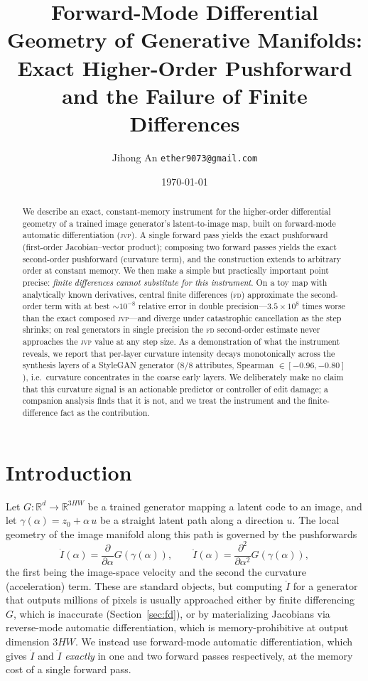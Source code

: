 \documentclass[11pt]{article}
\title{\vspace{-2em}Forward-Mode Differential Geometry of Generative Manifolds:\\
Exact Higher-Order Pushforward and the Failure of Finite Differences}
\author{Jihong An \quad\texttt{ether9073@gmail.com}}
\date{\today}
\newcommand{\R}{\mathbb{R}}
\newcommand{\jvp}{\textsc{jvp}}
\newcommand{\fd}{\textsc{fd}}
\begin{document}
\maketitle

\begin{abstract}
We describe an exact, constant-memory instrument for the higher-order
differential geometry of a trained image generator's latent-to-image map,
built on forward-mode automatic differentiation (\jvp). A single forward pass
yields the exact pushforward (first-order Jacobian--vector product); composing
two forward passes yields the exact second-order pushforward (curvature term),
and the construction extends to arbitrary order at constant memory. We then make
a simple but practically important point precise: \emph{finite differences
cannot substitute for this instrument}. On a toy map with analytically known
derivatives, central finite differences (\fd) approximate the second-order term
with at best $\sim$$10^{-8}$ relative error in double precision---$3.5\times10^{8}$
times worse than the exact composed \jvp---and diverge under catastrophic
cancellation as the step shrinks; on real generators in single precision the
\fd{} second-order estimate never approaches the \jvp{} value at any step size.
As a demonstration of what the instrument reveals, we report that per-layer
curvature intensity decays monotonically across the synthesis layers of a
StyleGAN generator (8/8 attributes, Spearman $\in[-0.96,-0.80]$), i.e.\ curvature
concentrates in the coarse early layers. We deliberately make no claim that this
curvature signal is an actionable predictor or controller of edit damage; a
companion analysis finds that it is not, and we treat the instrument and the
finite-difference fact as the contribution.
\end{abstract}

\section{Introduction}
Let $G:\R^{d}\to\R^{3HW}$ be a trained generator mapping a latent code to an
image, and let $\gamma(\alpha)=z_0+\alpha\,u$ be a straight latent path along a
direction $u$. The local geometry of the image manifold along this path is
governed by the pushforwards
\[
\dot I(\alpha)=\frac{\partial}{\partial\alpha}G(\gamma(\alpha)),
\qquad
\ddot I(\alpha)=\frac{\partial^2}{\partial\alpha^2}G(\gamma(\alpha)),
\]
the first being the image-space velocity and the second the curvature
(acceleration) term. These are standard objects, but computing $\ddot I$ for a
generator that outputs millions of pixels is usually approached either by
finite differencing $G$, which is inaccurate (Section~\ref{sec:fd}), or by
materializing Jacobians via reverse-mode automatic differentiation, which is
memory-prohibitive at output dimension $3HW$. We instead use forward-mode
automatic differentiation, which gives $\dot I$ and $\ddot I$ \emph{exactly} in
one and two forward passes respectively, at the memory cost of a single forward
pass.
\end{document}
